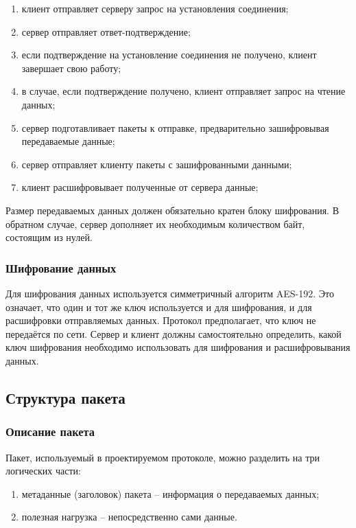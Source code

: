 \begin{enumerate}
	\item клиент отправляет серверу запрос на установления соединения;
	\item сервер отправляет ответ-подтверждение;
	\item если подтверждение на установление соединения не получено, клиент завершает свою работу;
	\item в случае, если подтверждение получено, клиент отправляет запрос на чтение данных;
	\item сервер подготавливает пакеты к отправке, предварительно зашифровывая передаваемые данные;
	\item сервер отправляет клиенту пакеты с зашифрованными данными;
	\item клиент расшифровывает полученные от сервера данные;
\end{enumerate}

Размер передаваемых данных должен обязательно кратен блоку шифрования. В обратном случае, сервер дополняет их необходимым количеством байт, состоящим из нулей.

\subsubsection{Шифрование данных}

Для шифрования данных используется симметричный алгоритм AES-192. Это означает, что один и тот же ключ используется и для шифрования, и для расшифровки отправляемых данных. Протокол предполагает, что ключ не передаётся по сети. Сервер и клиент должны самостоятельно определить, какой ключ шифрования необходимо использовать для шифрования и расшифровывания данных.

\subsection{Структура пакета}

\subsubsection{Описание пакета}

Пакет, используемый в проектируемом протоколе, можно разделить на три логических части:

\begin{enumerate}
	\item метаданные (заголовок) пакета  -- информация о передаваемых данных;
	\item полезная нагрузка -- непосредственно сами данные.
\end{enumerate}

